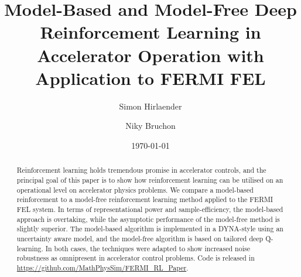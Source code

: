 \documentclass[
reprint,
amsmath,amssymb,amsfonts,clevref,
aps,
prstab,
]{revtex4-2}
\begin{document}
	
	
	
	
	\title{Model-Based and Model-Free Deep Reinforcement Learning in Accelerator Operation with Application to FERMI FEL}
	
	
	
	\author{Simon Hirlaender}
	\author{Niky Bruchon}%
	 
	
	\date{\today}%
	
	
	\begin{abstract}
		Reinforcement learning holds tremendous promise in accelerator controls, and the principal goal of this paper is to show how reinforcement learning can be utilised on an operational level on accelerator physics problems.
		We compare a model-based reinforcement to a model-free reinforcement learning method applied to the FERMI FEL system.  In terms of representational power and sample-efficiency, the model-based approach is overtaking, while the asymptotic performance of the model-free method is slightly superior. The model-based algorithm is implemented in a DYNA-style using an uncertainty aware model, and the model-free algorithm is based on tailored deep Q-learning. In both cases, the techniques were adapted to show increased noise robustness as omnipresent in accelerator control problems. Code is released in \url{https://github.com/MathPhysSim/FERMI_RL_Paper}.
		
	\end{abstract}
	\maketitle

\end{document}
